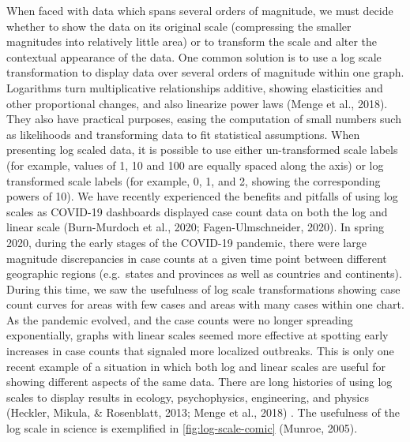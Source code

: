 \documentclass[print]{nuthesis}
\begin{document}
When faced with data which spans several orders of magnitude, we must decide whether to show the data on its original
scale (compressing the smaller magnitudes into relatively little area) or to transform the scale and alter the contextual appearance of the data.
One common solution is to use a log scale transformation to display data over several orders of magnitude within one graph.
Logarithms turn multiplicative relationships additive, showing elasticities and other proportional changes, and also linearize power laws (Menge et al., 2018).
They also have practical purposes, easing the computation of small numbers such as likelihoods and transforming data to fit statistical assumptions.
When presenting log scaled data, it is possible to use either un-transformed scale labels (for example, values of 1, 10 and 100 are equally spaced along the axis) or log transformed scale labels (for example, 0, 1, and 2, showing the corresponding powers of 10).
We have recently experienced the benefits and pitfalls of using log scales as COVID-19 dashboards displayed
case count data on both the log and linear scale (Burn-Murdoch et al., 2020; Fagen-Ulmschneider, 2020).
In spring 2020, during the early stages of the COVID-19 pandemic, there were large magnitude discrepancies in case counts at a given time point between different geographic regions (e.g.~states and provinces as well as countries and continents).
During this time, we saw the usefulness of log scale transformations showing case count curves for areas with few cases and areas with many cases within one chart.
As the pandemic evolved, and the case counts were no longer spreading exponentially, graphs with linear scales seemed more effective at spotting early increases in case counts that signaled more localized outbreaks.
This is only one recent example of a situation in which both log and linear scales are useful for showing different aspects of the same data. There are long histories of using log scales to display results in ecology, psychophysics, engineering, and physics (Heckler, Mikula, \& Rosenblatt, 2013; Menge et al., 2018) . The usefulness of the log scale in science is exemplified in \cref{fig:log-scale-comic} (Munroe, 2005). 
\end{document}
